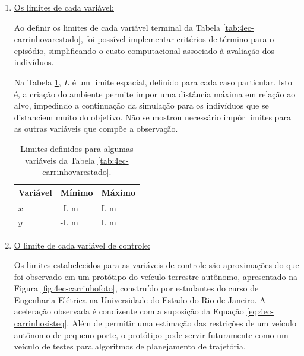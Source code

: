 \begin{enumerate}[label=\alph*)]
	\item \underline{Os limites de cada variável:}
	
	Ao definir os limites de cada variável terminal da Tabela \ref{tab:4ec-carrinhovarestado}, foi possível implementar critérios de término para o episódio, simplificando o custo computacional associado à avaliação dos indivíduos. 
	
	
	Na Tabela \ref{tab:4ec-carrinholimvariaveis}, $L$ é um limite espacial, definido para cada caso particular. Isto é, a criação do ambiente permite impor uma distância máxima em relação ao alvo, impedindo a continuação da simulação para os indivíduos que se distanciem muito do objetivo. Não se mostrou necessário impôr limites para as outras variáveis que compõe a observação.
	
	\begin{table}[H]
		\centering
		\caption{Limites definidos para algumas variáveis da Tabela \ref{tab:4ec-carrinhovarestado}.}
		\label{tab:4ec-carrinholimvariaveis}
		\begin{tabular}{l|l|l} \toprule
			{Variável} & {Mínimo} & {Máximo} \\ \midrule
			{$x$} & {-L \si{m}} & {L \si{m}} \\
			{$y$} & {-L \si{m}} & {L \si{m}} \\
			\bottomrule
		\end{tabular}
	\end{table}
	
	\item \underline{O limite de cada variável de controle:}
	
	Os limites estabelecidos para as variáveis de controle são aproximações do que foi observado em um protótipo do veículo terrestre autônomo, apresentado na Figura \ref{fig:4ec-carrinhofoto}, construído por estudantes do curso de Engenharia Elétrica na Universidade do Estado do Rio de Janeiro. A aceleração observada é condizente com a suposição da Equação \ref{eq:4ec-carrinhosisteq}. Além de permitir uma estimação das restrições de um veículo autônomo de pequeno porte, o protótipo pode servir futuramente como um veículo de testes para algoritmos de planejamento de trajetória.
	

\end{enumerate}
